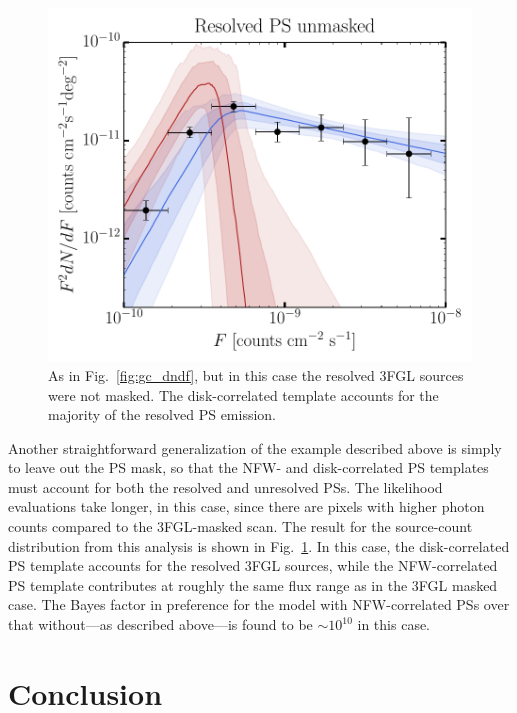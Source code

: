 \begin{figure}[htb]
\leavevmode
\begin{center}
\includegraphics[width=.8\textwidth]{ch-nptfit/dnds_unmasked.pdf}
\end{center}
\vspace{-.50cm}
\caption{As in Fig.~\ref{fig:gc_dndf}, but in this case the resolved 3FGL sources were not masked.  The disk-correlated template accounts for the majority of the resolved PS emission. }
\label{dNdF: unmasked}
\end{figure}   

Another straightforward generalization of the example described above is simply to leave out the PS mask, so that the NFW- and disk-correlated PS templates must account for both the resolved and unresolved PSs.  The likelihood evaluations take longer, in this case, since there are pixels with higher photon counts compared to the 3FGL-masked scan.  The result for the source-count distribution from this analysis is shown in Fig.~\ref{dNdF: unmasked}.  In this case, the disk-correlated PS template accounts for the resolved 3FGL sources, while the NFW-correlated PS template contributes at roughly the same flux range as in the 3FGL masked case.  The Bayes factor in preference for the model with NFW-correlated PSs over that without---as described above---is found to be $\sim$$10^{10}$ in this case.

\section{Conclusion}
\label{Conclusion}

